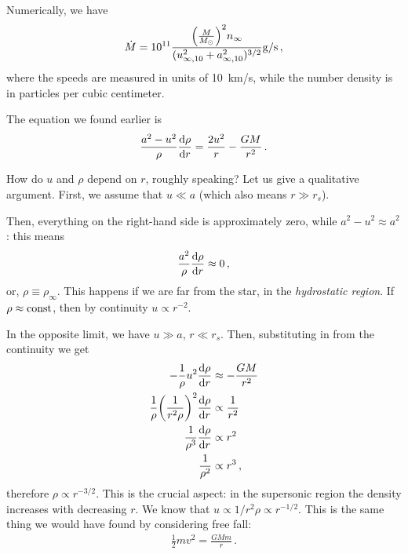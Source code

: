 \documentclass[main.tex]{subfiles}
\begin{document}
Numerically, we have 
%
\begin{align}
\dot{M} = \num{e11} \frac{\qty(\frac{M}{M_{\odot}})^2 n_\infty }{(u_{\infty, 10} ^2 + a_{\infty, 10}^2 )^{3/2}} \SI{}{g/s}
\,,
\end{align}
%
where the speeds are measured in units of \SI{10}{km/s}, while the number density is in particles per cubic centimeter.

The equation  we found earlier is 
%
\begin{align}
\frac{a^2- u^2}{\rho } \dv{\rho }{r} = \frac{2u^2}{r} - \frac{GM}{r^2}
\,.
\end{align}

How do \(u\) and \(\rho \) depend on \(r\), roughly speaking? 
Let us give a qualitative argument. First, we assume that \(u \ll a\) (which also means \(r \gg r_s\)).

Then, everything on the right-hand side is approximately zero, while \(a^2-  u^2 \approx a^2\): this means 
%
\begin{align}
\frac{a^2}{\rho } \dv{\rho }{r} \approx 0
\,,
\end{align}
%
or, \(\rho \equiv \rho _\infty \). This happens if we are far from the star, in the \emph{hydrostatic region}. 
If \(\rho \approx \text{const}\), then by continuity \(u \propto r^{-2}\).


In the opposite limit, we have \(u \gg a\), \(r \ll r_s\).
Then, substituting in from the continuity we get
%
\begin{align}
- \frac{1}{\rho } u^2 \dv{\rho }{r} &\approx - \frac{GM}{r^2}  \\
\frac{1}{\rho } \qty( \frac{1}{r^2 \rho })^2 \dv{\rho }{r} &\propto \frac{1}{r^2}  \\
\frac{1}{\rho^3 }\dv{\rho }{r} &\propto r^2  \\
\frac{1}{\rho^2} &\propto r^3
\,,
\end{align}
%
therefore \(\rho \propto r^{-3/2}\). This is the crucial aspect: in the supersonic region the density increases with decreasing \(r\). 
We know that \(u \propto 1/ r^2 \rho \propto r^{-1/2}\).  
This is the same thing we would have found by considering free fall: 
%
\begin{align}
\frac{1}{2} m v^2 = \frac{GMm}{r}
\,.
\end{align}
\end{document}
